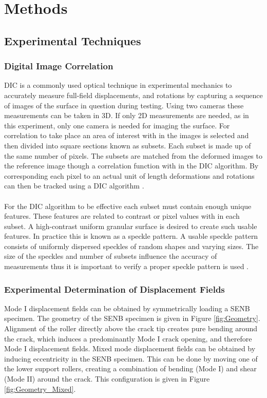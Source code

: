 \documentclass[12pt]{article}
\begin{document}
\section{Methods}

\subsection{Experimental Techniques} 

\subsubsection{Digital Image Correlation} %
DIC is a commonly used optical technique in experimental mechanics to accurately measure full-field displacements, and rotations by capturing a sequence of images of the surface in question during testing. Using two cameras these measurements can be taken in 3D. If only 2D measurements are needed, as in this experiment, only one camera is needed for imaging the surface.
For correlation to take place an area of interest with in the images is selected and then divided into square sections known as subsets. Each subset is made up of the same number of pixels.  The subsets are matched from the deformed images to the reference image though a correlation function with in the DIC algorithm. By corresponding each pixel to an actual unit of length deformations and rotations can then be tracked using a DIC algorithm \cite{DIC}.
\\
\\
For the DIC algorithm to be effective each subset must contain enough unique features.  These features are related to contrast or pixel values with in each subset. A high-contrast uniform granular surface is desired to create such usable features. In practice this is known as a speckle pattern. A usable speckle pattern consists of uniformly dispersed speckles of  random shapes and varying sizes. The size of the speckles and number of subsets influence the accuracy of measurements thus it is important to verify a proper speckle pattern is used \cite{speckle}.  

\subsubsection{Experimental Determination of Displacement Fields} %
Mode I displacement fields can be obtained by symmetrically loading a SENB specimen. The geometry of the SENB specimen is given in Figure \ref{fig:Geometry}. Alignment of the roller directly above the crack tip creates pure bending around the crack, which induces a predominantly Mode I crack opening, and therefore Mode I displacement fields. Mixed mode displacement fields can be obtained by inducing eccentricity in the SENB specimen. This can be done by moving one of the lower support rollers, creating a combination of bending (Mode I) and shear (Mode II) around the crack. This configuration is given in Figure \ref{fig:Geometry_Mixed}.  
\end{document}
